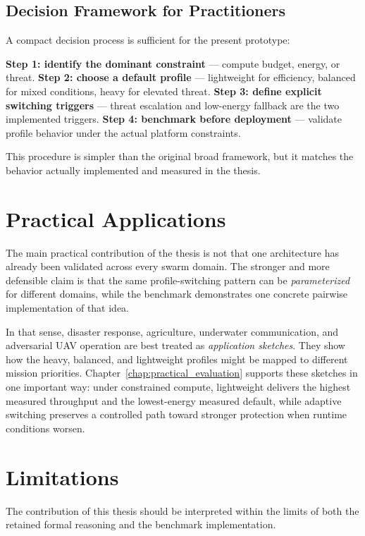 \subsection*{Decision Framework for Practitioners}

A compact decision process is sufficient for the present prototype:

\textbf{Step 1: identify the dominant constraint} --- compute budget, energy, or threat.
\textbf{Step 2: choose a default profile} --- lightweight for efficiency, balanced for mixed conditions, heavy for elevated threat.
\textbf{Step 3: define explicit switching triggers} --- threat escalation and low-energy fallback are the two implemented triggers.
\textbf{Step 4: benchmark before deployment} --- validate profile behavior under the actual platform constraints.

This procedure is simpler than the original broad framework, but it matches the behavior actually implemented and measured in the thesis.

\section{Practical Applications}
\label{sec:practical_applications}

The main practical contribution of the thesis is not that one architecture has already been validated across every swarm domain. The stronger and more defensible claim is that the same profile-switching pattern can be \emph{parameterized} for different domains, while the benchmark demonstrates one concrete pairwise implementation of that idea.

In that sense, disaster response, agriculture, underwater communication, and adversarial UAV operation are best treated as \emph{application sketches}. They show how the heavy, balanced, and lightweight profiles might be mapped to different mission priorities. Chapter~\ref{chap:practical_evaluation} supports these sketches in one important way: under constrained compute, lightweight delivers the highest measured throughput and the lowest-energy measured default, while adaptive switching preserves a controlled path toward stronger protection when runtime conditions worsen.

\section{Limitations}
\label{sec:limitations}

The contribution of this thesis should be interpreted within the limits of both the retained formal reasoning and the benchmark implementation.

